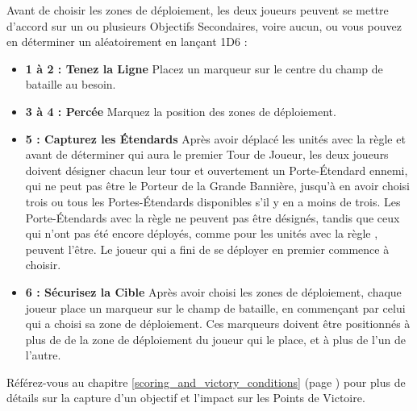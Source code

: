 Avant de choisir les zones de déploiement, les deux joueurs peuvent se mettre d'accord sur un ou plusieurs Objectifs Secondaires, voire aucun, ou vous pouvez en déterminer un aléatoirement en lançant 1D6 : 
\begin{itemize}[label={-}]
\item \textbf{1 à 2 : Tenez la Ligne}\newline
{}\newline
Placez un marqueur sur le centre du champ de bataille au besoin.
\item \textbf{3 à 4 : Percée}\newline
{}\newline
Marquez la position des zones de déploiement.
\item \textbf{5 : Capturez les Étendards}\newline
{}\newline
Après avoir déplacé les unités avec la règle \vanguard{} et avant de déterminer qui aura le premier Tour de Joueur, les deux joueurs doivent désigner chacun leur tour et ouvertement un Porte-Étendard ennemi, qui ne peut pas être le Porteur de la Grande Bannière, jusqu'à en avoir choisi trois ou tous les Portes-Étendards disponibles s'il y en a moins de trois. Les Porte-Étendards avec la règle \lighttroops{} ne peuvent pas être désignés, tandis que ceux qui n'ont pas été encore déployés, comme pour les unités avec la règle \ambush{}, peuvent l'être. Le joueur qui a fini de se déployer en premier commence à choisir.
\item \textbf{6 : Sécurisez la Cible}\newline
{}\newline
Après avoir choisi les zones de déploiement, chaque joueur place un marqueur sur le champ de bataille, en commençant par celui qui a choisi sa zone de déploiement. Ces marqueurs doivent être positionnés à plus de  de la zone de déploiement du joueur qui le place, et à plus de  l'un de l'autre.
\end{itemize}

Référez-vous au chapitre \ref{scoring_and_victory_conditions} (page \pageref{scoring_and_victory_conditions}) pour plus de détails sur la capture d'un objectif et l'impact sur les Points de Victoire.

